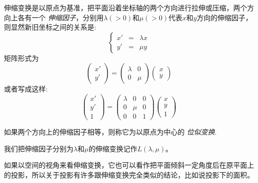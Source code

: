 伸缩变换是以原点为基准，把平面沿着坐标轴的两个方向进行拉伸或压缩，两个方向上各有一个 \emph{伸缩因子}，分别用$\lambda(>0)$和$\mu(>0)$代表$x$和$y$方向的伸缩因子，则显然新旧坐标之间的关系是:
\begin{equation}
  \label{eq:scale-translation-coordinate-formula}
  \left\{
    \begin{array}{ccc}
      x' & = & \lambda x \\
      y' & = & \mu y
    \end{array}
  \right.
\end{equation}
矩阵形式为
\begin{equation*}
  \left(
    \begin{array}{c}
      x' \\
      y'
    \end{array}
  \right)
    =
    \left(
      \begin{array}{cc}
        \lambda & 0 \\
        0 & \mu
      \end{array}
    \right)
  \left(
    \begin{array}{c}
      x \\
      y
    \end{array}
  \right)
\end{equation*}
或者写成这样:
\begin{equation*}
  \label{eq:scale-translation-coordinate-formula-matrix}
  \left(
    \begin{array}{c}
      x' \\
      y' \\
      1
    \end{array}
  \right)
    =
    \left(
      \begin{array}{ccc}
        \lambda & 0 & 0 \\
        0 & \mu & 0 \\
        0 & 0 & 1
      \end{array}
    \right)
  \left(
    \begin{array}{c}
      x \\
      y \\
      1
    \end{array}
  \right)
\end{equation*}

如果两个方向上的伸缩因子相等，则称它为以原点为中心的 \emph{位似变换}.

我们把伸缩因子分别为$\lambda$和$\mu$的伸缩变换记作$L(\lambda, \mu)$。

如果以空间的视角来看伸缩变换，它也可以看作把平面倾斜一定角度后在原平面上的投影，所以关于投影有许多跟伸缩变换完全类似的结论，比如说投影下的面积。


